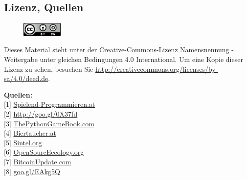 \subsection*{Lizenz, Quellen} 
\begin{figure}
\includegraphics[width=2cm]{editorial/ccbysa88x31.png}
\end{figure}
Dieses Material steht unter der Creative-Commons-Lizenz Namensnennung - Weitergabe unter gleichen Bedingungen 4.0 International. Um eine Kopie dieser Lizenz zu sehen, besuchen Sie \url{http://creativecommons.org/licenses/by-sa/4.0/deed.de}.

\textbf{Quellen:} \\
{[}1{]} \href{http://spielend-programmieren.at}{Spielend-Programmieren.at} \\
{[}2{]} \href{http://spielend-programmieren.at/de:tutorials:start}{http://goo.gl/0X37fd} \\
{[}3{]} \href{http://thepythongamebook.com}{ThePythonGameBook.com} \\
{[}4{]} \href{http://biertaucher.at}{Biertaucher.at} \\
{[}5{]} \href{http://www.sintel.org/}{Sintel.org} \\
{[}6{]} \href{http://opensourceecology.org/}{OpenSourcEecology.org} \\
{[}7{]} \href{http://www.bitcoinupdate.com/}{BitcoinUpdate.com} \\
{[}8{]} \href{http://www.amazon.de/gp/product/1449388396/ref=as_li_ss_tl?ie=UTF8&camp=1638&creative=19454&creativeASIN=1449388396&linkCode=as2&tag=spielendprogr-21}{goo.gl/EAkg5Q} \\










